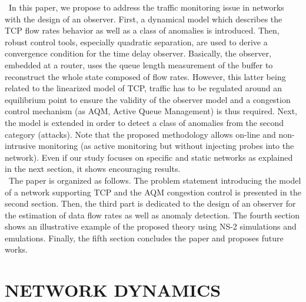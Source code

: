 \documentclass[a4paper, 10pt, onecolumn]{article}
\begin{document}
~\indent In this paper, we propose to address the traffic monitoring issue in networks with the design of an observer. First, a dynamical model which describes the TCP flow rates behavior as well as a class of anomalies is introduced. Then, robust control tools, especially quadratic separation, are used to derive a convergence condition for the time delay observer. Basically, the observer, embedded at a router, uses the queue length measurement of the buffer to reconstruct the whole state composed of flow rates. However, this latter being related to the linearized model of TCP, traffic has to be regulated around an equilibrium point to ensure the validity of the observer model and a congestion control mechanism (as AQM, Active Queue Management) is thus required. Next, the model is extended in order to detect a class of anomalies from the second category (attacks). Note that the proposed methodology allows on-line and non-intrusive monitoring (as active monitoring but without injecting probes into the network). Even if our study focuses on specific and static networks as explained in the next section, it shows encouraging results. 
\\~\indent The paper is organized as follows. The problem statement introducing the model of a network supporting TCP and the AQM congestion control is presented in the second section. Then, the third part is dedicated to the design of an observer for the estimation of data flow rates as well as anomaly detection. The fourth section shows an illustrative example of the proposed theory using NS-2 simulations and emulations. Finally, the fifth section concludes the paper and proposes future works.\\


\section{NETWORK DYNAMICS}
\end{document}
